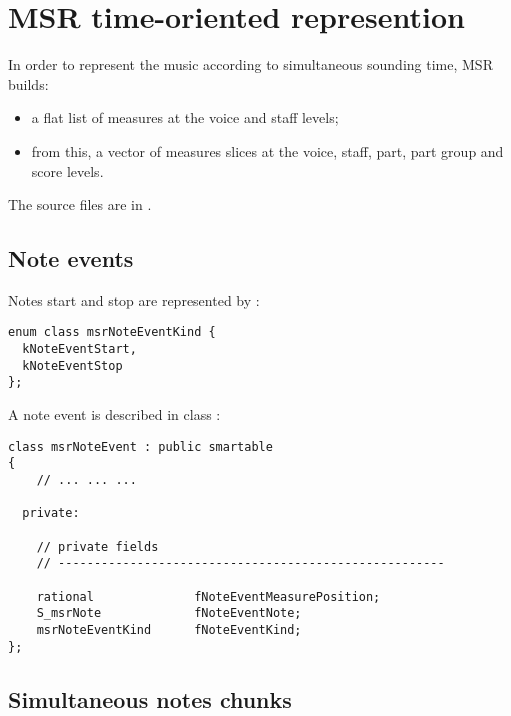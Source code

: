 
\chapter{MSR time-oriented represention}\label{MSR time-oriented represention}

In order to represent the music according to simultaneous sounding time, MSR builds:
\begin{itemize}
\item a flat list of measures at the voice and staff levels;
\item from this, a vector of measures slices at the voice, staff, part, part group and score levels.
\end{itemize}

The source files are in .


\section{Note events}

Notes start and stop are represented by :
\begin{lstlisting}[language=CPlusPlus]
enum class msrNoteEventKind {
  kNoteEventStart,
  kNoteEventStop
};
\end{lstlisting}

A note event is described in class {\tt }:
\begin{lstlisting}[language=CPlusPlus]
class msrNoteEvent : public smartable
{
	// ... ... ...

  private:

    // private fields
    // ------------------------------------------------------

    rational              fNoteEventMeasurePosition;
    S_msrNote             fNoteEventNote;
    msrNoteEventKind      fNoteEventKind;
};
\end{lstlisting}


\section{Simultaneous notes chunks}

